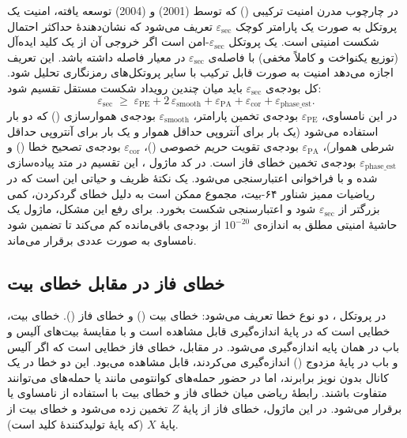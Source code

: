 در چارچوب مدرن امنیت ترکیبی () که توسط  (2001) و  (2004) توسعه یافته، امنیت یک پروتکل  به صورت یک پارامتر کوچک $\varepsilon_{\text{sec}}$ تعریف می‌شود که نشان‌دهندۀ حداکثر احتمال شکست امنیتی است. یک پروتکل $\varepsilon_{\text{sec}}$-امن است اگر خروجی آن از یک کلید ایده‌آل (توزیع یکنواخت و کاملاً مخفی) با فاصله‌ی $\varepsilon_{\text{sec}}$ در معیار  فاصله داشته باشد. این تعریف اجازه می‌دهد امنیت  به صورت قابل ترکیب با سایر پروتکل‌های رمزنگاری تحلیل شود. کل بودجه‌ی $\varepsilon_{\text{sec}}$ باید میان چندین رویداد شکست مستقل تقسیم شود:
\begin{equation}
	\varepsilon_{\text{sec}} \;\ge\; \varepsilon_{\text{PE}} + 2\,\varepsilon_{\text{smooth}} + \varepsilon_{\text{PA}} + \varepsilon_{\text{cor}} + \varepsilon_{\text{phase\_est}}.
\end{equation}
در این نامساوی، $\varepsilon_{\text{PE}}$ بودجه‌ی تخمین پارامتر، $\varepsilon_{\text{smooth}}$ بودجه‌ی هموارسازی () که دو بار استفاده می‌شود (یک بار برای آنتروپی حداقل هموار و یک بار برای آنتروپی حداقل شرطی هموار)، $\varepsilon_{\text{PA}}$ بودجه‌ی تقویت حریم خصوصی ()، $\varepsilon_{\text{cor}}$ بودجه‌ی تصحیح خطا () و $\varepsilon_{\text{phase\_est}}$ بودجه‌ی تخمین خطای فاز است. در کد ماژول ، این تقسیم در متد  پیاده‌سازی شده و با فراخوانی  اعتبارسنجی می‌شود. یک نکتۀ ظریف و حیاتی این است که در ریاضیات ممیز شناور ۶۴-بیت، مجموع  ممکن است به دلیل خطای گردکردن، کمی بزرگتر از $\varepsilon_{\text{sec}}$ شود و اعتبارسنجی شکست بخورد. برای رفع این مشکل، ماژول یک حاشیۀ امنیتی مطلق به اندازه‌ی $10^{-20}$ از بودجه‌ی باقی‌مانده کم می‌کند تا تضمین شود نامساوی به صورت عددی برقرار می‌ماند.

\subsection{خطای فاز در مقابل خطای بیت}

در پروتکل ، دو نوع خطا تعریف می‌شود: خطای بیت () و خطای فاز (). خطای بیت، خطایی است که در پایۀ اندازه‌گیری قابل مشاهده است و با مقایسۀ بیت‌های آلیس و باب در همان پایه اندازه‌گیری می‌شود. در مقابل، خطای فاز خطایی است که اگر آلیس و باب در پایۀ مزدوج () اندازه‌گیری می‌کردند، قابل مشاهده می‌بود. این دو خطا در یک کانال بدون نویز برابرند، اما در حضور حمله‌های کوانتومی مانند  یا حمله‌های  می‌توانند متفاوت باشند. رابطۀ ریاضی میان خطای فاز و خطای بیت با استفاده از نامساوی  یا  برقرار می‌شود. در این ماژول، خطای فاز از پایۀ $Z$ تخمین زده می‌شود و خطای بیت از پایۀ $X$ (که پایۀ تولیدکنندۀ کلید است).

